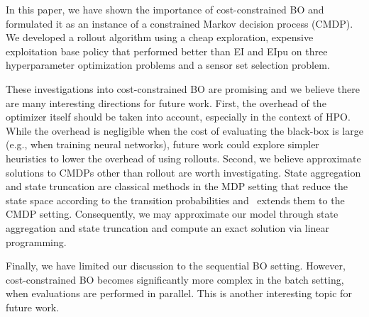 In this paper, we have shown the importance of cost-constrained BO and formulated it as an instance of a constrained Markov decision process (CMDP).
We developed a rollout algorithm using a cheap exploration, expensive exploitation base policy that performed better than EI and EIpu on three hyperparameter optimization problems and a sensor set selection problem.  

These investigations into cost-constrained BO are promising and we believe there are many interesting directions for future work. 
First, the overhead of the optimizer itself should be taken into account, especially in the context of HPO. 
While the overhead is negligible when the cost of evaluating the black-box is large (e.g., when training neural networks), future work could explore simpler heuristics to lower the overhead of using rollouts.
Second, we believe approximate solutions to CMDPs other than rollout are worth investigating. 
State aggregation and state truncation are classical methods in the MDP setting that reduce the state space according to the transition probabilities and~\citet{altman1999constrained} extends them to the CMDP setting. 
Consequently, we may approximate our model through state aggregation and state truncation and compute an exact solution via linear programming.

Finally, we have limited our discussion to the sequential BO setting. 
However, cost-constrained BO becomes significantly more complex in the batch setting, when evaluations are performed in parallel.
This is another interesting topic for future work.

